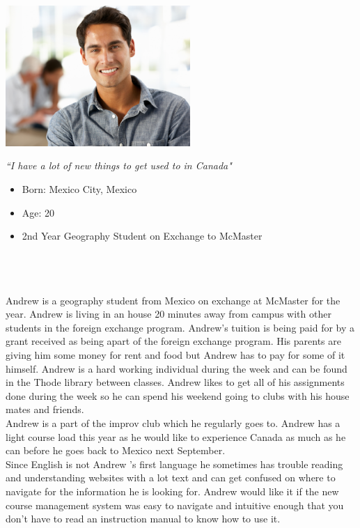 \documentclass[12pt]{article}
\begin{document}
\begin{minipage}{70mm}
\includegraphics[width=70mm]{Adrian.png}
\begin{center}
\emph{``I have a lot of new things to get used to in Canada"}
\end{center}
\end{minipage}\hfill
\begin{minipage}{\textwidth}
\begin{itemize}
\item Born: Mexico City, Mexico
\item Age: 20
\item 2nd Year Geography Student on Exchange to McMaster
\end{itemize}
\end{minipage}\\\\\\

Andrew is a geography student from Mexico on exchange at McMaster for the year. Andrew is living in an house 20 minutes away from campus with other students in the foreign exchange program. Andrew's tuition is being paid for by a grant received as being apart of the foreign exchange program. His parents are giving him some money for rent and food but Andrew has to pay for some of it himself. Andrew is a hard working individual during the week and can be found in the Thode library between classes. Andrew likes to get all of his assignments done during the week so he can spend his weekend going to clubs with his house mates and friends.\\

Andrew is a part of the improv club which he regularly goes to. Andrew has a light course load this year as he would like to experience Canada as much as he can before he goes back to Mexico next September.\\

Since English is not Andrew 's first language he sometimes has trouble reading and understanding websites with a lot text and can get confused on where to navigate for the information he is looking for. Andrew would like it if the new course management system was easy to navigate and intuitive enough that you don't have to read an instruction manual to know how to use it.
\end{document}
